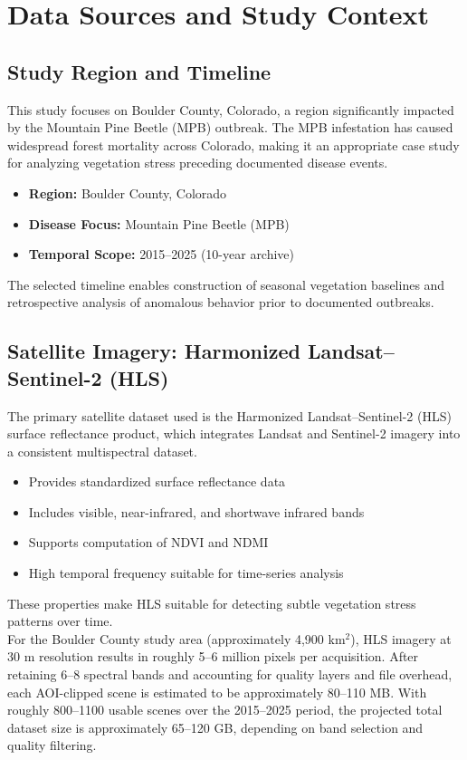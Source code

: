 \section{Data Sources and Study Context}

\subsection{Study Region and Timeline}

This study focuses on Boulder County, Colorado, a region significantly impacted by the Mountain Pine Beetle (MPB) outbreak. The MPB infestation has caused widespread forest mortality across Colorado, making it an appropriate case study for analyzing vegetation stress preceding documented disease events.

\begin{itemize}
    \item \textbf{Region:} Boulder County, Colorado
    \item \textbf{Disease Focus:} Mountain Pine Beetle (MPB)
    \item \textbf{Temporal Scope:} 2015--2025 (10-year archive)
\end{itemize}

The selected timeline enables construction of seasonal vegetation baselines and retrospective analysis of anomalous behavior prior to documented outbreaks.

\subsection{Satellite Imagery: Harmonized Landsat--Sentinel-2 (HLS)}

The primary satellite dataset used is the Harmonized Landsat--Sentinel-2 (HLS) surface reflectance product, which integrates Landsat and Sentinel-2 imagery into a consistent multispectral dataset.

\begin{itemize}
    \item Provides standardized surface reflectance data
    \item Includes visible, near-infrared, and shortwave infrared bands
    \item Supports computation of NDVI and NDMI
    \item High temporal frequency suitable for time-series analysis
\end{itemize}

These properties make HLS suitable for detecting subtle vegetation stress patterns over time.\\
For the Boulder County study area (approximately 4,900 km$^2$), HLS imagery at 30 m resolution results in roughly 5--6 million pixels per acquisition. After retaining 6--8 spectral bands and accounting for quality layers and file overhead, each AOI-clipped scene is estimated to be approximately 80--110 MB. With roughly 800--1100 usable scenes over the 2015--2025 period, the projected total dataset size is approximately 65--120 GB, depending on band selection and quality filtering.

